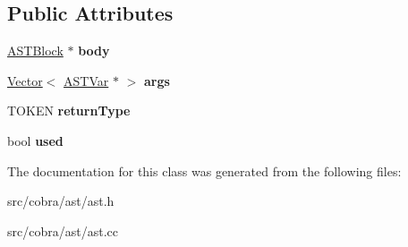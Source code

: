 \subsection*{Public Attributes}
\begin{DoxyCompactItemize}
\item 
\hypertarget{class_cobra_1_1internal_1_1_a_s_t_func_a6e67ed4f5bba2a0cf2a65cdc72180730}{\hyperlink{class_cobra_1_1internal_1_1_a_s_t_block}{A\+S\+T\+Block} $\ast$ {\bfseries body}}\label{class_cobra_1_1internal_1_1_a_s_t_func_a6e67ed4f5bba2a0cf2a65cdc72180730}

\item 
\hypertarget{class_cobra_1_1internal_1_1_a_s_t_func_a77f8ebe9de90987e5412c0571dea1028}{\hyperlink{class_cobra_1_1internal_1_1_vector}{Vector}$<$ \hyperlink{class_cobra_1_1internal_1_1_a_s_t_var}{A\+S\+T\+Var} $\ast$ $>$ {\bfseries args}}\label{class_cobra_1_1internal_1_1_a_s_t_func_a77f8ebe9de90987e5412c0571dea1028}

\item 
\hypertarget{class_cobra_1_1internal_1_1_a_s_t_func_af938985cdaa168bb8d8edd152710fedc}{T\+O\+K\+E\+N {\bfseries return\+Type}}\label{class_cobra_1_1internal_1_1_a_s_t_func_af938985cdaa168bb8d8edd152710fedc}

\item 
\hypertarget{class_cobra_1_1internal_1_1_a_s_t_func_a176b06a935d329dcaf9333cabc01ae5c}{bool {\bfseries used}}\label{class_cobra_1_1internal_1_1_a_s_t_func_a176b06a935d329dcaf9333cabc01ae5c}

\end{DoxyCompactItemize}


The documentation for this class was generated from the following files\+:\begin{DoxyCompactItemize}
\item 
src/cobra/ast/ast.\+h\item 
src/cobra/ast/ast.\+cc\end{DoxyCompactItemize}
